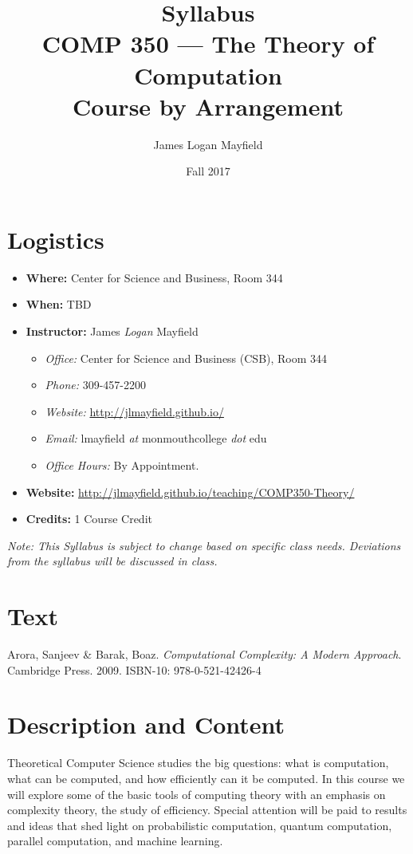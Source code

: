\documentclass[nobib]{tufte-handout}
\title{Syllabus \\ COMP 350 --- The Theory of Computation \\ \large{Course by Arrangement} }
\author{ James Logan Mayfield }
\date{ Fall 2017 }
\begin{document}
\maketitle

\section{Logistics}
\begin{itemize}
\item \textbf{Where: } Center for Science and Business, Room 344
\item \textbf{When: } TBD
\item \textbf{Instructor: } James \textit{Logan} Mayfield\begin{itemize}
\item \textit{Office: } Center for Science and Business (CSB), Room 344
\item \textit{Phone: } 309-457-2200 %
\item \textit{Website: } \url{http://jlmayfield.github.io/}
\item \textit{Email: } lmayfield \textit{at} monmouthcollege \textit{dot} edu
\item \textit{Office Hours: }  By Appointment.
\end{itemize}
\item \textbf{Website: } \url{http://jlmayfield.github.io/teaching/COMP350-Theory/}
\item \textbf{Credits: } 1 Course Credit
\end{itemize}
\emph{Note: This Syllabus is subject to change based on specific class needs. Deviations from the syllabus will be discussed in class.}


\section{Text}

Arora, Sanjeev \& Barak, Boaz. \textit{Computational Complexity: A Modern Approach}. Cambridge Press. 2009. ISBN-10: 978-0-521-42426-4 %


\section{Description and Content}

Theoretical Computer Science studies the big questions: what is computation, what can be computed, and how efficiently can it be computed.  In this course we will explore some of the basic tools of computing theory with an emphasis on complexity theory, the study of efficiency. Special attention will be paid to results and ideas that shed light on probabilistic computation, quantum computation, parallel computation, and machine learning.
\end{document}
